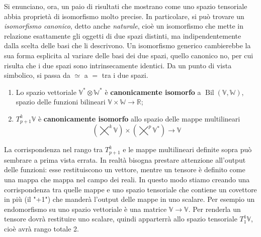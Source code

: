 Si enunciano, ora, un paio di risultati che mostrano come uno spazio tensoriale abbia proprietà di isomorfismo molto precise.
In particolare, si può trovare un \emph{isomorfismo canonico}, detto anche \emph{naturale}, cioè un isomorfismo che mette in relazione esattamente gli oggetti di due spazi distinti, ma indipendentemente dalla scelta delle basi che li descrivono.
Un isomorfismo generico cambierebbe la sua forma esplicita al variare delle basi dei due spazi, quello canonico no, per cui risulta che i due spazi sono intrinsecamente identici.
Da un punto di vista simbolico, si passa da $\simeq$ a $=$ tra i due spazi.
\begin{proposition}
    \begin{enumerate} Isomorfismi canonici tra spazi tensoriali e forme bi- o multi-lineari:
        \item Lo spazio vettoriale $\mathbb{V}^* \otimes \mathbb{W}^*$ è \textbf{canonicamente isomorfo} a $\operatorname{Bil}(\mathbb{V}, \mathbb{W})$, spazio delle funzioni bilineari $\mathbb{V} \times \mathbb{W} \longrightarrow \mathbb{R}$;
        \item $T^k_{p+1} \mathbb{V}$ è \textbf{canonicamente isomorfo} allo spazio delle mappe multilineari
              \[
                  \left(\bigtimes^k \mathbb{V}\right) \times \left(\bigtimes^p \mathbb{V}^*\right) \longrightarrow \mathbb{V}
              \]
    \end{enumerate}
\end{proposition}
La corrispondenza nel rango tra $T^k_{p+1}$ e le mappe multilineari definite sopra può sembrare a prima vista errata.
In realtà bisogna prestare attenzione all'output delle funzioni: esse restituiscono un vettore, mentre un tensore è definito come una mappa che mappa nel campo dei reali.
In questo modo stiamo creando una corrispondenza tra quelle mappe e uno spazio tensoriale che contiene un covettore in più (il "+1") che manderà l'output delle mappe in uno scalare.
Per esempio un endomorfismo su uno spazio vettoriale è una matrice $\mathbb{V} \longrightarrow \mathbb{V}$.
Per renderla un tensore dovrà restituire uno scalare, quindi apparterrà allo spazio tensoriale $T^1_1\mathbb{V}$, cioè avrà rango totale 2.

